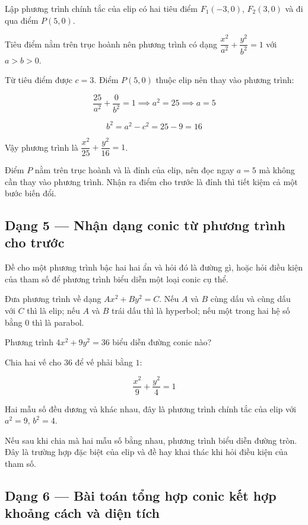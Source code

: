 \documentclass[11pt, a4paper]{article}
\begin{document}
\begin{vidu}[{4}]
Lập phương trình chính tắc của elip có hai tiêu điểm $F_1(-3, 0)$, $F_2(3, 0)$ và đi qua điểm $P(5, 0)$.

Tiêu điểm nằm trên trục hoành nên phương trình có dạng $\dfrac{x^2}{a^2} + \dfrac{y^2}{b^2} = 1$ với $a > b > 0$.

Từ tiêu điểm được $c = 3$. Điểm $P(5, 0)$ thuộc elip nên thay vào phương trình:

$$\frac{25}{a^2} + \frac{0}{b^2} = 1 \implies a^2 = 25 \implies a = 5$$

$$b^2 = a^2 - c^2 = 25 - 9 = 16$$

Vậy phương trình là $\dfrac{x^2}{25} + \dfrac{y^2}{16} = 1$.

 Điểm $P$ nằm trên trục hoành và là đỉnh của elip, nên đọc ngay $a = 5$ mà không cần thay vào phương trình. Nhận ra điểm cho trước là đỉnh thì tiết kiệm cả một bước biến đổi.

\end{vidu}
\subsection{Dạng 5 — Nhận dạng conic từ phương trình cho trước}

 Đề cho một phương trình bậc hai hai ẩn và hỏi đó là đường gì, hoặc hỏi điều kiện của tham số để phương trình biểu diễn một loại conic cụ thể.

 Đưa phương trình về dạng $Ax^2 + By^2 = C$. Nếu $A$ và $B$ cùng dấu và cùng dấu với $C$ thì là elip; nếu $A$ và $B$ trái dấu thì là hyperbol; nếu một trong hai hệ số bằng $0$ thì là parabol.

\begin{vidu}[{5}]
Phương trình $4x^2 + 9y^2 = 36$ biểu diễn đường conic nào?

Chia hai vế cho $36$ để vế phải bằng $1$:

$$\frac{x^2}{9} + \frac{y^2}{4} = 1$$

Hai mẫu số đều dương và khác nhau, đây là phương trình chính tắc của elip với $a^2 = 9$, $b^2 = 4$.

 Nếu sau khi chia mà hai mẫu số bằng nhau, phương trình biểu diễn đường tròn. Đây là trường hợp đặc biệt của elip và đề hay khai thác khi hỏi điều kiện của tham số.

\end{vidu}
\subsection{Dạng 6 — Bài toán tổng hợp conic kết hợp khoảng cách và diện tích}
\end{document}
